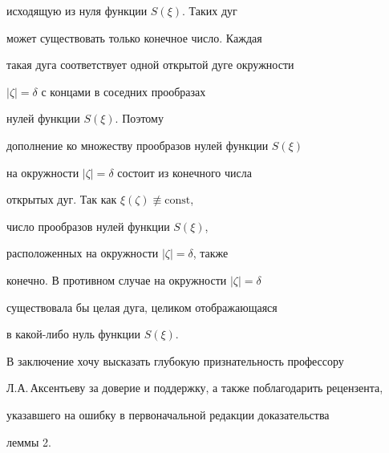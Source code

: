 \begin{pf}
исходящую из нуля функции $S(\xi)$. Таких дуг


может существовать только конечное число. Каждая


такая дуга соответствует одной открытой дуге окружности


$|\zeta|=\delta$ с концами в соседних прообразах


нулей функции $S(\xi)$. Поэтому


дополнение ко множеству прообразов нулей функции $S(\xi)$


на окружности $|\zeta|=\delta$ состоит из конечного числа


открытых дуг. Так как $\xi(\zeta)\not\equiv \mathrm{const}$,


число прообразов нулей функции $S(\xi)$, 


расположенных на окружности $|\zeta|=\delta$, также


конечно. В противном случае на окружности $|\zeta|=\delta$


существовала бы целая дуга, целиком отображающаяся


в какой-либо нуль функции $S(\xi)$.


\end{pf}





В заключение хочу высказать глубокую признательность профессору 


Л.А.\,Аксентьеву за доверие и поддержку, а также поблагодарить рецензента, 


указавшего на ошибку в первоначальной редакции доказательства


леммы 2.








